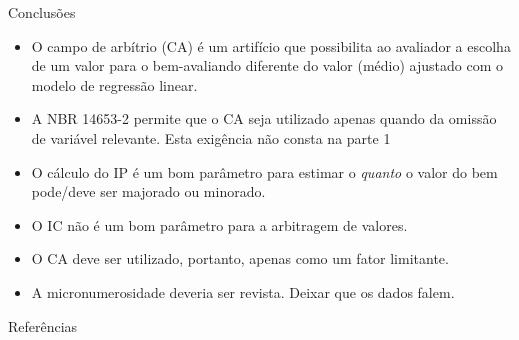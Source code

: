 \documentclass[9pt,ignorenonframetext,aspectratio=169]{beamer}
\newif\ifbibliography
\providecommand{\tightlist}{%
  \setlength{\itemsep}{0pt}\setlength{\parskip}{0pt}}
\begin{document}
\begin{frame}{Conclusões}

\begin{itemize}[<+->]
\tightlist
\item
  \alert<1>{O campo de arbítrio (CA) é um artifício que possibilita ao 
  avaliador a escolha de um valor para o bem-avaliando diferente do valor (médio) 
  ajustado com o modelo de regressão linear.}
\end{itemize}

\begin{itemize}[<+->]
\tightlist
\item
  \alert<2>{A NBR 14653-2 \citeyear{NBR1465302} permite que o CA seja 
  utilizado apenas quando da omissão de variável relevante. Esta exigência não 
  consta na parte 1 \citeyear{NBR1465301}}
\end{itemize}

\begin{itemize}[<+->]
\tightlist
\item
  \alert<3>{O cálculo do IP é um bom parâmetro para estimar o \emph{quanto} o 
  valor do bem pode/deve ser majorado ou minorado.}
\end{itemize}

\begin{itemize}[<+->]
\tightlist
\item
  \alert<4>{O IC não é um bom parâmetro para a arbitragem de valores.}
\end{itemize}

\begin{itemize}[<+->]
\tightlist
\item
  \alert<5>{O CA deve ser utilizado, portanto, apenas como um fator limitante.}
\end{itemize}

\begin{itemize}[<+->]
\tightlist
\item
  \alert<6>{A micronumerosidade deveria ser revista. Deixar que os dados falem.}
\end{itemize}

\end{frame}


  \begin{frame}[allowframebreaks]{Referências}
  \bibliographytrue
  \printbibliography[heading=none]
  \end{frame}
\end{document}
